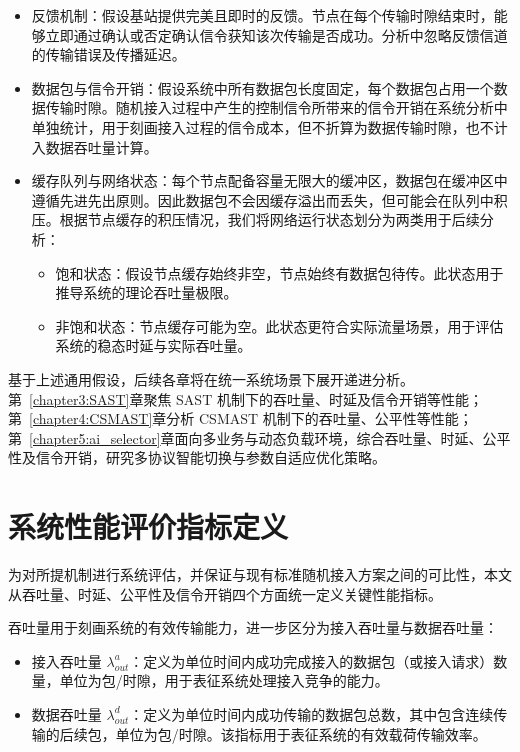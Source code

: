 \begin{itemize}
	\item 反馈机制：假设基站提供完美且即时的反馈。节点在每个传输时隙结束时，能够立即通过确认或否定确认信令获知该次传输是否成功。分析中忽略反馈信道的传输错误及传播延迟。
	
	\item 数据包与信令开销：假设系统中所有数据包长度固定，每个数据包占用一个数据传输时隙。随机接入过程中产生的控制信令所带来的信令开销在系统分析中单独统计，用于刻画接入过程的信令成本，但不折算为数据传输时隙，也不计入数据吞吐量计算。
	
	\item 缓存队列与网络状态：每个节点配备容量无限大的缓冲区，数据包在缓冲区中遵循先进先出原则。因此数据包不会因缓存溢出而丢失，但可能会在队列中积压。根据节点缓存的积压情况，我们将网络运行状态划分为两类用于后续分析：
	\begin{itemize}
		\item 饱和状态：假设节点缓存始终非空，节点始终有数据包待传。此状态用于推导系统的理论吞吐量极限。
		\item 非饱和状态：节点缓存可能为空。此状态更符合实际流量场景，用于评估系统的稳态时延与实际吞吐量。
	\end{itemize}
\end{itemize}

基于上述通用假设，后续各章将在统一系统场景下展开递进分析。第~\ref{chapter3:SAST}章聚焦 SAST 机制下的吞吐量、时延及信令开销等性能；第~\ref{chapter4:CSMAST}章分析 CSMAST 机制下的吞吐量、公平性等性能；第~\ref{chapter5:ai_selector}章面向多业务与动态负载环境，综合吞吐量、时延、公平性及信令开销，研究多协议智能切换与参数自适应优化策略。


\section{系统性能评价指标定义}
\label{sec:performance_metrics}

为对所提机制进行系统评估，并保证与现有标准随机接入方案之间的可比性，本文从吞吐量、时延、公平性及信令开销四个方面统一定义关键性能指标。

吞吐量用于刻画系统的有效传输能力，进一步区分为接入吞吐量与数据吞吐量：

\begin{itemize}
	\item 接入吞吐量 $\lambda^a_{out}$：定义为单位时间内成功完成接入的数据包（或接入请求）数量，单位为包/时隙，用于表征系统处理接入竞争的能力。
	
	\item 数据吞吐量 $\lambda^d_{out}$：定义为单位时间内成功传输的数据包总数，其中包含连续传输的后续包，单位为包/时隙。该指标用于表征系统的有效载荷传输效率。
\end{itemize}

